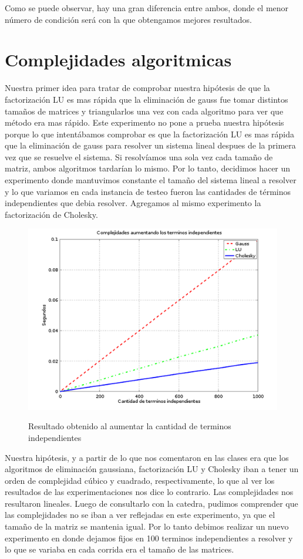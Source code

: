 Como se puede observar, hay una gran diferencia entre ambos, donde el menor número de condición será con la que obtengamos mejores resultados.

\section{Complejidades algoritmicas}

\indent Nuestra primer idea para tratar de comprobar nuestra hipótesis de que la factorización LU es mas rápida que la eliminación de gauss fue tomar distintos tamaños de matrices y triangularlos una vez con cada algoritmo para ver que método era mas rápido. Este experimento no pone a prueba nuestra hipótesis porque lo que intentábamos comprobar es que la factorización LU es mas rápida que la eliminación de gauss para resolver un sistema lineal despues de la primera vez que se resuelve el sistema. Si resolvíamos una sola vez cada tamaño de matriz, ambos algoritmos tardarían lo mismo. Por lo tanto, decidimos hacer un experimento donde mantuvimos constante el tamaño del sistema lineal a resolver y lo que variamos en cada instancia de testeo fueron las cantidades de términos independientes que debia resolver. Agregamos al mismo experimento la factorización de Cholesky.

\begin{figure}[H]
   \includegraphics[scale=0.5]{ComplejidadesMalas.png}
   \label{Fig. 6}
   \caption{Resultado obtenido al aumentar la cantidad de terminos independientes}
\end{figure}

\indent Nuestra hipótesis, y a partir de lo que nos comentaron en las clases era que los algoritmos de eliminación gaussiana, factorización LU y Cholesky iban a tener un orden de complejidad cúbico y cuadrado, respectivamente, lo que al ver los resultados de las experimentaciones nos dice lo contrario. Las complejidades nos resultaron lineales.
Luego de consultarlo con la catedra, pudimos comprender que las complejidades no se iban a ver reflejadas en este experimento, ya que el tamaño de la matriz se mantenia igual. Por lo tanto debimos realizar un nuevo experimento en donde dejamos fijos en 100 terminos independientes a resolver y lo que se variaba en cada corrida era el tamaño de las matrices.


